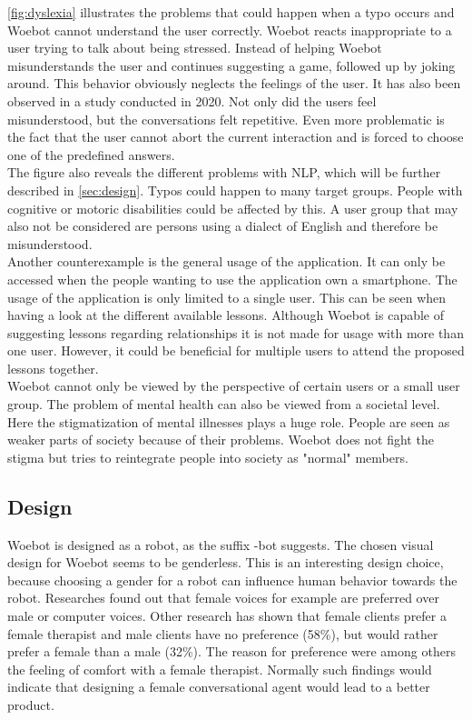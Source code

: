 \autoref{fig:dyslexia} illustrates the problems that could happen when a typo occurs and Woebot cannot understand the user correctly.
Woebot reacts inappropriate to a user trying to talk about being stressed.
Instead of helping Woebot misunderstands the user and continues suggesting a game, followed up by joking around.
This behavior obviously neglects the feelings of the user.
It has also been observed in a study conducted in 2020\cite{investigating-students}.
Not only did the users feel misunderstood, but the conversations felt repetitive.
Even more problematic is the fact that the user cannot abort the current interaction and is forced to choose one of the predefined answers.\\

The figure also reveals the different problems with NLP, which will be further described in \autoref{sec:design}.
Typos could happen to many target groups.
People with cognitive or motoric disabilities could be affected by this.
A user group that may also not be considered are persons using a dialect of English and therefore be misunderstood.\\

Another counterexample is the general usage of the application.
It can only be accessed when the people wanting to use the application own a smartphone.
The usage of the application is only limited to a single user.
This can be seen when having a look at the different available lessons.
Although Woebot is capable of suggesting lessons regarding relationships it is not made for usage with more than one user.
However, it could be beneficial for multiple users to attend the proposed lessons together.\\

Woebot cannot only be viewed by the perspective of certain users or a small user group.
The problem of mental health can also be viewed from a societal level.
Here the stigmatization of mental illnesses plays a huge role\cite{stigmatization}.
People are seen as weaker parts of society because of their problems.
Woebot does not fight the stigma but tries to reintegrate people into society as "normal" members.

\subsection{Design}\label{sec:design}
Woebot is designed as a robot, as the suffix -bot suggests.
The chosen visual design for Woebot seems to be genderless.
This is an interesting design choice, because choosing a gender for a robot can influence human behavior towards the robot.
Researches found out that female voices for example are preferred over male or computer voices\cite{bias-robot}.
Other research has shown that female clients prefer a female therapist and male clients have no preference (58\%), but would rather prefer a female than a male (32\%)\cite{client-gender-preference}.
The reason for preference were among others the feeling of comfort with a female therapist.
Normally such findings would indicate that designing a female conversational agent would lead to a better product.\\

